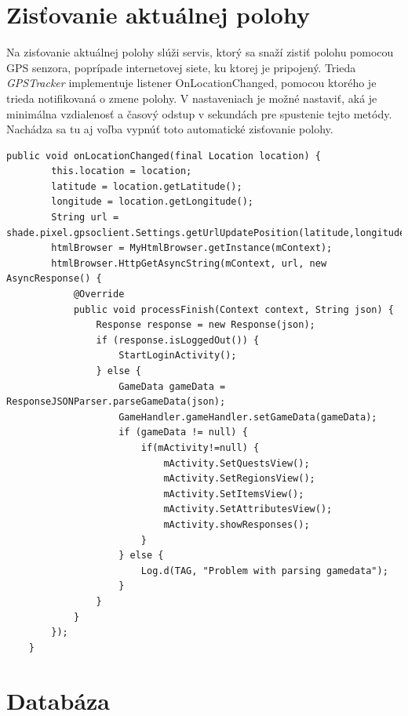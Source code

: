 \section{Zisťovanie aktuálnej polohy}
Na zisťovanie aktuálnej polohy slúži servis, ktorý sa snaží zistiť polohu pomocou GPS senzora, poprípade internetovej siete, ku ktorej je pripojený. Trieda \emph{GPSTracker} implementuje listener OnLocationChanged, pomocou ktorého je trieda notifikovaná o zmene polohy. V nastaveniach je možné nastaviť, aká je minimálna vzdialenosť a časový odstup v sekundách pre spustenie tejto metódy. Nachádza sa tu aj voľba vypnúť toto automatické zisťovanie polohy. 
\lstset{language=Java,
basicstyle=\tiny}
\begin{lstlisting}[frame=single]   
   public void onLocationChanged(final Location location) {
        this.location = location;
        latitude = location.getLatitude();
        longitude = location.getLongitude();
        String url = shade.pixel.gpsoclient.Settings.getUrlUpdatePosition(latitude,longitude);
        htmlBrowser = MyHtmlBrowser.getInstance(mContext);
        htmlBrowser.HttpGetAsyncString(mContext, url, new AsyncResponse() {
            @Override
            public void processFinish(Context context, String json) {
                Response response = new Response(json);
                if (response.isLoggedOut()) {
                    StartLoginActivity();
                } else {
                    GameData gameData = ResponseJSONParser.parseGameData(json);
                    GameHandler.gameHandler.setGameData(gameData);
                    if (gameData != null) {
                        if(mActivity!=null) { 
                            mActivity.SetQuestsView();
                            mActivity.SetRegionsView();
                            mActivity.SetItemsView();
                            mActivity.SetAttributesView();
                            mActivity.showResponses();
                        }
                    } else {
                        Log.d(TAG, "Problem with parsing gamedata");
                    }
                }
            }
        });
    }
\end{lstlisting}



\section{Databáza}
